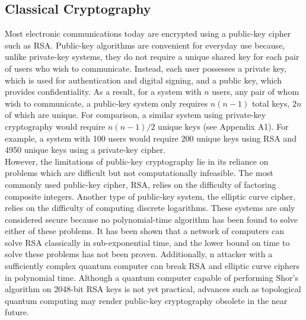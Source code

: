 \documentclass[conference]{IEEEtran}
\begin{document}
\subsection{Classical Cryptography}%
Most electronic communications today are encrypted using a public-key cipher such as RSA\cite{Rivest}. Public-key algorithms are convenient for everyday use because, unlike private-key systems, they do not require a unique shared key for each pair of users who wish to communicate. Instead, each user possesses a private key, which is used for authentication and digital signing, and a public key, which provides confidentiality. As a result, for a system with $n$ users, any pair of whom wish to communicate, a public-key system only requires $n(n-1)$ total keys, $2n$ of which are unique. For comparison, a similar system using private-key cryptography would require $n(n-1)/2$ unique keys (see Appendix A1). For example, a system with 100 users would require 200 unique keys using RSA and 4950 unique keys using a private-key cipher.\\

However, the limitations of public-key cryptography lie in its reliance on problems which are difficult but not computationally infeasible. The most commonly used public-key cipher, RSA, relies on the difficulty of factoring composite integers\cite{Rivest}. Another type of public-key system, the elliptic curve cipher, relies on the difficulty of computing discrete logarithms\cite{Rosing}. These systems are only considered secure because no polynomial-time algorithm has been found to solve either of these problems. It has been shown that a network of computers can solve RSA classically in sub-exponential time\cite{Weisstein}, and the lower bound on time to solve these problems has not been proven. Additionally, n attacker with a sufficiently complex quantum computer can break RSA and elliptic curve ciphers in polynomial time\cite{Shor}. Although a quantum computer capable of performing Shor's algorithm on 2048-bit RSA keys is not yet practical, advances such as topological quantum computing may render public-key cryptography obsolete in the near future.\\
\end{document}
